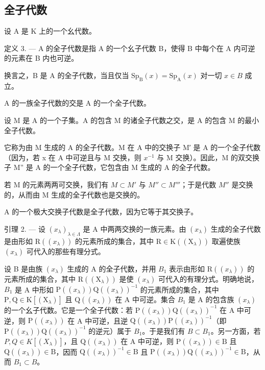 \subsection{全子代数}

设 A 是 K 上的一个幺代数。

定义 3. --- A 的全子代数是指 A 的一个幺子代数 B，使得 B 中每个在 A 内可逆的元素在 B 内也可逆。

换言之，B 是 A 的全子代数，当且仅当 \(\mathrm{Sp}_{\mathrm{B}}(x)=\mathrm{Sp}_{\mathrm{A}}(x)\) 对一切 \(x\in B\) 成立。

A 的一族全子代数的交是 A 的一个全子代数。

设 M 是 A 的一个子集。A 的包含 M 的诸全子代数之交，是 A 的包含 M 的最小全子代数。

它称为由 M 生成的 A 的全子代数。M 在 A 中的交换子 M′ 是 A 的一个全子代数（因为，若 x 在 A 中可逆且与 M 交换，则 \(x^{-1}\) 与 M 交换）。因此，M 的双交换子 M'' 是 A 的一个全子代数，它包含由 M 生成的 A 的全子代数。

若 M 的元素两两可交换，我们有 \(M \subset M'\) 与 \(M'' \subset M'''\)；于是代数 \(M''\) 是交换的，从而由 M 生成的全子代数也是交换的。

A 的一个极大交换子代数是全子代数，因为它等于其交换子。

引理 2. --- 设 \((x_{\lambda})_{\lambda \in \Lambda}\) 是 A 中两两交换的一族元素。由 \((x_{\lambda})\) 生成的全子代数是由形如 \(\mathrm{R}((x_{\lambda}))\) 的元素所成的集合，其中 \(\mathrm{R} \in \mathrm{K}((\mathrm{X}_{\lambda}))\) 取遍使族 \((x_{\lambda})\) 可代入的那些有理分式。

设 B 是由族 \((x_{\lambda})\) 生成的 A 的全子代数，并用 \(B_{1}\) 表示由形如 \(\mathrm{R}((x_{\lambda}))\) 的元素所成的集合，其中 \(\mathrm{R}((\mathrm{X}_{\lambda}))\) 是使 \((x_{\lambda})\) 可代入的有理分式。明确地说，\(B_{1}\) 是 A 中形如 \(\mathrm{P}((x_{\lambda}))\mathrm{Q}((x_{\lambda}))^{-1}\) 的元素所成的集合，其中 \(\mathrm{P},\mathrm{Q}\in\mathrm{K}[(\mathrm{X}_{\lambda})]\) 且 \(\mathrm{Q}((x_{\lambda}))\) 在 A 中可逆。集合 \(B_{1}\) 是 A 的包含族 \((x_{\lambda})\) 的一个幺子代数。它是一个全子代数：若 \(\mathrm{P}((x_{\lambda}))\mathrm{Q}((x_{\lambda}))^{-1}\) 在 A 中可逆，则 \(\mathrm{P}((x_{\lambda}))\) 在 A 中可逆，且逆 \(\mathrm{Q}((x_{\lambda}))\mathrm{P}((x_{\lambda}))^{-1}\)（即 \(\mathrm{P}((x_{\lambda}))\mathrm{Q}((x_{\lambda}))^{-1}\) 的逆元）属于 \(B_{1}\)。于是我们有 \(B\subset B_{1}\)。另一方面，若 \(P,Q\in K[(X_{\lambda})]\)，且 \(\mathrm{Q}((x_{\lambda}))\) 在 A 中可逆，则 \(\mathrm{P}((x_{\lambda}))\in\mathrm{B}\) 且 \(\mathrm{Q}((x_{\lambda}))\in\mathrm{B}\)，因而 \(\mathrm{Q}((x_{\lambda}))^{-1}\in\mathrm{B}\) 且 \(\mathrm{P}((x_{\lambda}))\mathrm{Q}((x_{\lambda}))^{-1}\in\mathrm{B}\)，从而 \(B_{1}\subset B\)。

